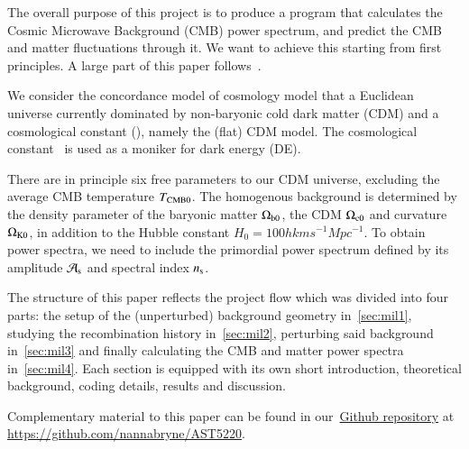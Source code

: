 


The overall purpose of this project is to produce a program that calculates the Cosmic Microwave Background (CMB) power spectrum, and predict the CMB and matter fluctuations through it. We want to achieve this starting from first principles. A large part of this paper follows~\citet{Callin2006}.

We consider the concordance model of cosmology model that a Euclidean universe currently dominated by non-baryonic cold dark matter (CDM) and a cosmological constant (\textLambda), namely the (flat) \textLambda CDM model. The cosmological constant \textLambda\, is used as a moniker for dark energy (DE).~\citep{DodelsonBook}

There are in principle six free parameters to our \textLambda CDM universe, excluding the average CMB temperature $T_{\mathrm{CMB}0}$. The homogenous background is determined by the density parameter of the baryonic matter $\Omega_\mathrm{b0}$, the CDM $\Omega_\mathrm{c0}$ and curvature $\Omega_\mathrm{K0}$, in addition to the Hubble constant $H_0 =100h \unit{km} \unit{s^{-1}} \unit{Mpc^{-1}}$. To obtain power spectra, we need to include the primordial power spectrum defined by its amplitude $\mathcal{A}_\mathrm{s}$ and spectral index $n_\mathrm{s}$.


The structure of this paper reflects the project flow which was divided into four parts: the setup of the (unperturbed) background geometry in~\cref{sec:mil1}, studying the recombination history in~\cref{sec:mil2}, perturbing said background in~\cref{sec:mil3} and finally calculating the CMB and matter power spectra in~\cref{sec:mil4}. Each section is equipped with its own short introduction, theoretical background, coding details, results and discussion. 

Complementary material to this paper can be found in our~\href{https://github.com/nannabryne/AST5220}{Github repository} at \url{https://github.com/nannabryne/AST5220}.